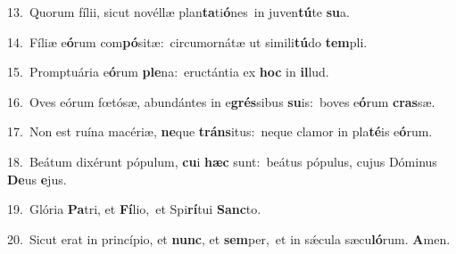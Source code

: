 {\numbfont\textcolor{\numbcolor}{13.}}~Quorum fílii, sicut novéllæ plan\-\textbf{ta}\-ti\-\textbf{ó}\-nes~\star in juven\-\textbf{tú}\-te \textbf{su}\-a.\par
{\numbfont\textcolor{\numbcolor}{14.}}~Fíliæ e\-\textbf{ó}\-rum com\-\textbf{pó}\-sitæ:~\star circumornátæ ut simili\-\textbf{tú}\-do \textbf{tem}\-pli.\par
{\numbfont\textcolor{\numbcolor}{15.}}~Promptuária e\-\textbf{ó}\-rum \textbf{ple}\-na:~\star eructántia ex \textbf{hoc} in \textbf{il}\-lud.\par
{\numbfont\textcolor{\numbcolor}{16.}}~Oves eórum fœtósæ, abundántes in e\-\textbf{grés}\-sibus \textbf{su}\-is:~\star boves e\-\textbf{ó}\-rum \textbf{cras}\-sæ.\par
{\numbfont\textcolor{\numbcolor}{17.}}~Non est ruína macériæ, \textbf{ne}\-que \textbf{tráns}\-itus:~\star neque clamor in pla\-\textbf{té}\-is e\-\textbf{ó}\-rum.\par
{\numbfont\textcolor{\numbcolor}{18.}}~Beátum dixérunt pópulum, \textbf{cu}\-i \textbf{hæc} sunt:~\star beátus pópulus, cujus Dóminus \textbf{De}\-us \textbf{e}\-jus.\par
{\numbfont\textcolor{\numbcolor}{19.}}~Glória \textbf{Pa}\-tri, et \textbf{Fí}\-lio,~\star et Spi\-\textbf{rí}\-tui \textbf{Sanc}\-to.\par
{\numbfont\textcolor{\numbcolor}{20.}}~Sicut erat in princípio, et \textbf{nunc}\-, et \textbf{sem}\-per,~\star et in sǽcula sæcu\-\textbf{ló}\-rum. \textbf{A}\-men.\par

